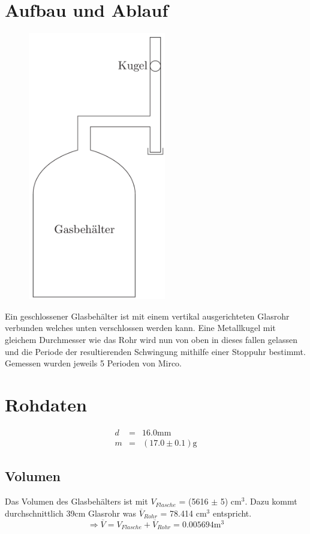 \documentclass[12pt,a4paper]{article}
\begin{document}
\section*{Aufbau und Ablauf}
\begin{figure}
\vspace{-50pt}
\centering
\includegraphics[width=6cm]{illustration.pdf}
\end{figure}
Ein geschlossener Glasbeh\"alter ist mit einem vertikal ausgerichteten Glasrohr verbunden welches unten verschlossen werden kann. Eine Metallkugel mit gleichem Durchmesser wie das Rohr wird nun von oben in dieses fallen gelassen und die Periode der resultierenden Schwingung mithilfe einer Stoppuhr bestimmt. Gemessen wurden jeweils 5 Perioden von Mirco.


\section*{Rohdaten}
\begin{eqnarray*}
d & = & 16.0\mbox{mm} \\
m & = & (17.0 \pm 0.1) \mbox{g}
\end{eqnarray*} 
\subsection*{Volumen}
Das Volumen des Glasbeh\"alters ist mit $V_{Flasche}$ = (5616 $\pm $ 5) cm$^3$. Dazu kommt durchschnittlich 39cm Glasrohr was $\overline{V}_{Rohr}$ = 78.414 cm$^3$ entspricht.
\[ \Rightarrow \overline{V} = V_{Flasche} + \overline{V}_{Rohr} = 0.005694\mbox{m}^3 \]
\end{document}
